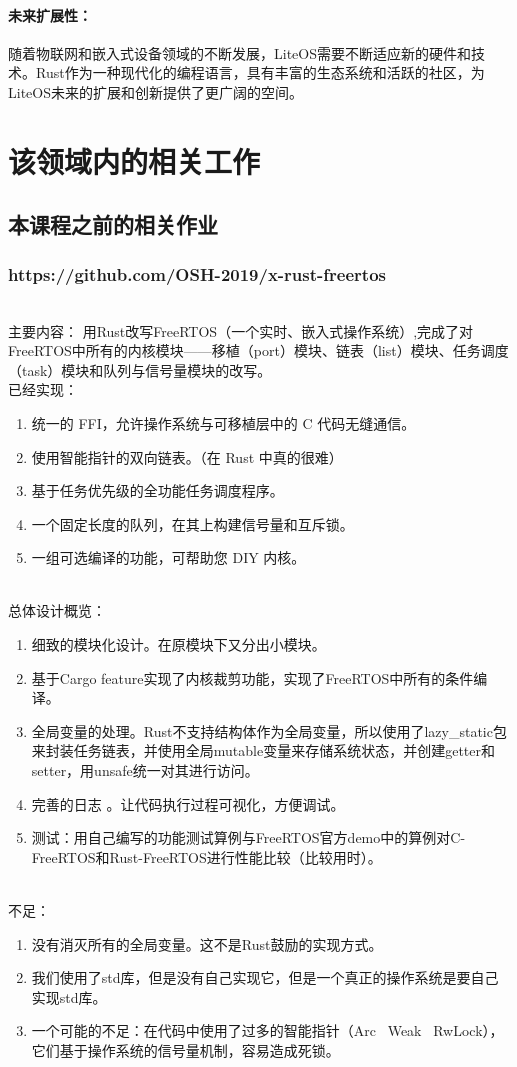 \documentclass{ctexart}
\begin{document}
\paragraph{未来扩展性：}
 随着物联网和嵌入式设备领域的不断发展，LiteOS需要不断适应新的硬件和技术。Rust作为一种现代化的编程语言，具有丰富的生态系统和活跃的社区，为LiteOS未来的扩展和创新提供了更广阔的空间。
\section{该领域内的相关工作}
\subsection{本课程之前的相关作业}
\subsubsection{https://github.com/OSH-2019/x-rust-freertos}\ \\
\indent 主要内容： 用Rust改写FreeRTOS（一个实时、嵌入式操作系统）,完成了对FreeRTOS中所有的内核模块——移植（port）模块、链表（list）模块、任务调度（task）模块和队列与信号量模块的改写。\\
\indent 已经实现：
\begin{enumerate}
\item 统一的 FFI，允许操作系统与可移植层中的 C 代码无缝通信。
\item 使用智能指针的双向链表。（在 Rust 中真的很难）
\item 基于任务优先级的全功能任务调度程序。
\item 一个固定长度的队列，在其上构建信号量和互斥锁。
\item 一组可选编译的功能，可帮助您 DIY 内核。
\end{enumerate}\ \\
\indent 总体设计概览：
\begin{enumerate}
\item 
细致的模块化设计。在原模块下又分出小模块。
\item 基于Cargo feature实现了内核裁剪功能，实现了FreeRTOS中所有的条件编译。
\item 全局变量的处理。Rust不支持结构体作为全局变量，所以使用了lazy\_static包来封装任务链表，并使用全局mutable变量来存储系统状态，并创建getter和setter，用unsafe统一对其进行访问。
\item 完善的日志 。让代码执行过程可视化，方便调试。
\item 测试：用自己编写的功能测试算例与FreeRTOS官方demo中的算例对C-FreeRTOS和Rust-FreeRTOS进行性能比较（比较用时）。
\end{enumerate}\ \\
\indent 不足：
\begin{enumerate}
\item 没有消灭所有的全局变量。这不是Rust鼓励的实现方式。
\item 我们使用了std库，但是没有自己实现它，但是一个真正的操作系统是要自己实现std库。
\item 一个可能的不足：在代码中使用了过多的智能指针（Arc \ Weak \ RwLock），它们基于操作系统的信号量机制，容易造成死锁。
\end{enumerate}
\end{document}
